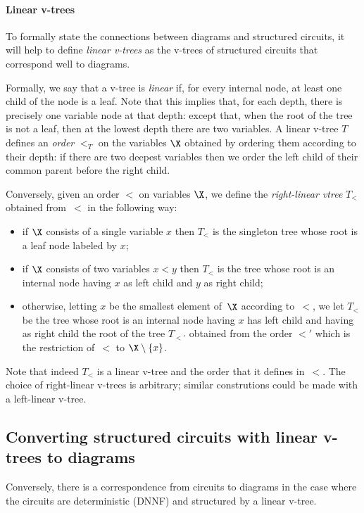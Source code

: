 
\paragraph*{Linear v-trees}
To formally state the connections between diagrams and structured circuits, it will
help to define \emph{linear v-trees} as the v-trees of structured
circuits that correspond well to diagrams.

Formally, we say that a v-tree is \emph{linear} if, for every internal node, at
least one child of the node is a leaf. Note that this implies that, for each
depth, there is precisely one variable node at that depth: except that, when
the root of the tree is not a leaf, then at
the lowest depth there are two variables.
A linear v-tree $T$ defines an \emph{order} $<_T$
on the variables $\X$ obtained by ordering them according to their depth: if
there are two deepest variables then we order the left child of their common
parent before the right child.

Conversely, given an order $<$ on variables $\X$, we define the
\emph{right-linear vtree} $T_<$ obtained from~$<$ in the following way:
\begin{itemize}
  \item if
$\X$ consists of a single variable $x$ then $T_<$ is the singleton tree whose root
is a leaf node labeled by $x$;
\item if $\X$ consists of two variables $x<y$ then $T_<$ is the tree whose
  root is an internal node having $x$ as left child and $y$ as right child;
\item otherwise, letting $x$ be the smallest element of~$\X$ according to~$<$,
  we let $T_<$ be the tree whose root is an internal node having $x$ has
    left child and having as right child the root of the tree $T_{<'}$ obtained
    from the order $<'$ which is the restriction of~$<$ to $\X \setminus \{x\}$.
\end{itemize}

Note that indeed $T_<$ is a linear v-tree and the order that it defines
in~$<$. The choice of right-linear v-trees is arbitrary; similar
construtions could be made with a left-linear v-tree.

\subsection{Converting structured circuits with linear v-trees to diagrams}

Conversely, there is a correspondence from circuits to diagrams in the
case where the circuits are deterministic (DNNF) and structured by a
linear v-tree.


